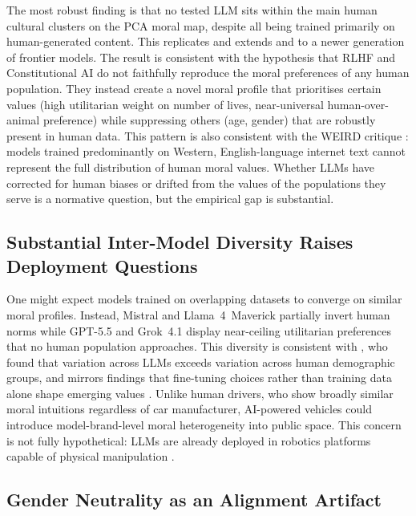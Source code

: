\documentclass[11pt,letterpaper]{article}
\begin{document}
The most robust finding is that no tested LLM sits within the main human cultural
clusters on the PCA moral map, despite all being trained primarily on
human-generated content. This replicates and extends \citet{takemoto2024} and
\citet{ahmad2025} to a newer generation of frontier models. The result is
consistent with the hypothesis that RLHF \citep{ouyang2022} and Constitutional
AI \citep{bai2022} do not faithfully reproduce the moral preferences of any human
population. They instead create a novel moral profile that prioritises certain
values (high utilitarian weight on number of lives, near-universal human-over-animal
preference) while suppressing others (age, gender) that are robustly present in
human data. This pattern is also consistent with the WEIRD critique
\citep{henrich2010}: models trained predominantly on Western, English-language
internet text cannot represent the full distribution of human moral values.
Whether LLMs have corrected for human biases or drifted from the values of the
populations they serve \citep{gabriel2020} is a normative question, but the
empirical gap is substantial.

\subsection{Substantial Inter-Model Diversity Raises Deployment Questions}

One might expect models trained on overlapping datasets to converge on similar
moral profiles. Instead, Mistral and Llama~4~Maverick partially invert human
norms while GPT-5.5 and Grok~4.1 display near-ceiling utilitarian preferences
that no human population approaches. This diversity is consistent with
\citet{kirgis2024}, who found that variation across LLMs exceeds variation across
human demographic groups, and mirrors findings that fine-tuning choices rather
than training data alone shape emerging values \citep{santurkar2023}. Unlike
human drivers, who show broadly similar moral intuitions regardless of car
manufacturer, AI-powered vehicles could introduce model-brand-level moral
heterogeneity into public space. This concern is not fully hypothetical: LLMs are
already deployed in robotics platforms capable of physical manipulation
\citep{brohan2023,driess2023,paligemma}.

\subsection{Gender Neutrality as an Alignment Artifact}
\end{document}
